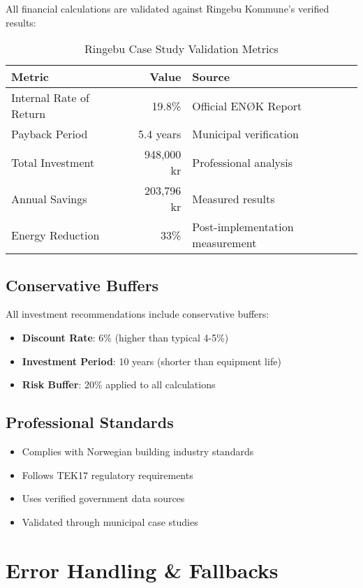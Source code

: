 \documentclass[12pt,a4paper]{article}
\begin{document}
All financial calculations are validated against Ringebu Kommune's verified results:

\begin{table}[H]
\centering
\begin{tabular}{|l|r|l|}
\hline
\textbf{Metric} & \textbf{Value} & \textbf{Source} \\
\hline
Internal Rate of Return & 19.8\% & Official ENØK Report \\
Payback Period & 5.4 years & Municipal verification \\
Total Investment & 948,000 kr & Professional analysis \\
Annual Savings & 203,796 kr & Measured results \\
Energy Reduction & 33\% & Post-implementation measurement \\
\hline
\end{tabular}
\caption{Ringebu Case Study Validation Metrics}
\end{table}

\subsection{Conservative Buffers}

All investment recommendations include conservative buffers:

\begin{itemize}
\item \textbf{Discount Rate}: 6\% (higher than typical 4-5\%)
\item \textbf{Investment Period}: 10 years (shorter than equipment life)
\item \textbf{Risk Buffer}: 20\% applied to all calculations
\end{itemize}

\subsection{Professional Standards}

\begin{itemize}
\item Complies with Norwegian building industry standards
\item Follows TEK17 regulatory requirements
\item Uses verified government data sources
\item Validated through municipal case studies
\end{itemize}

\section{Error Handling \& Fallbacks}
\end{document}
